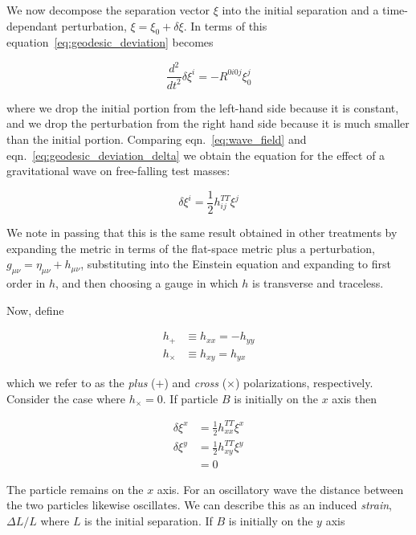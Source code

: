 We now decompose the separation vector $\xi$ into the initial
separation and a time-dependant perturbation, $\xi = \xi_0 + \delta
\xi$.  In terms of this equation~\ref{eq:geodesic_deviation} becomes

\begin{equation}
\label{eq:geodesic_deviation_delta}
\frac{d^2}{dt^2} \delta \xi^i = -R^{0 i 0 j} \xi_0^j
\end{equation}

where we drop the initial portion from the left-hand side because it
is constant, and we drop the perturbation from the right hand side
because it is much smaller than the initial portion.  Comparing
eqn.~\ref{eq:wave_field} and eqn.~\ref{eq:geodesic_deviation_delta}
we obtain the equation for the effect of a gravitational wave on
free-falling test masses:

\begin{equation}
\label{eq:wave_effect}
\delta \xi^i = \frac{1}{2} h^{TT}_{ij} \xi^j
\end{equation}

We note in passing that this is the same result obtained in other
treatments by expanding the metric in terms of the flat-space metric
plus a perturbation, $g_{\mu\nu} = \eta_{\mu\nu} + h_{\mu\nu}$,
substituting into the Einstein equation and expanding to first order
in $h$, and then choosing a gauge in which $h$ is transverse and
traceless.

Now, define

\begin{align*}
h_+ &\equiv h_{xx} = - h_{yy} \\
h_\times &\equiv h_{xy} = h_{yx}
\end{align*}

which we refer to as the \emph{plus} ($+$) and \emph{cross} ($\times$)
polarizations, respectively.  Consider the case where $h_\times = 0$.
If particle $B$ is initially on the $x$ axis then 

\begin{align*}
\delta \xi^x &= \frac{1}{2} h^{TT}_{xx} \xi^x \\
\delta \xi^y &= \frac{1}{2} h^{TT}_{xy} \xi^y \\
&= 0
\end{align*}

The particle remains on the $x$ axis.  For an oscillatory wave the
distance between the two particles likewise oscillates.  We can
describe this as an induced \emph{strain}, $\Delta L/L$ where $L$ is
the initial separation.  If $B$ is initially on the $y$ axis

